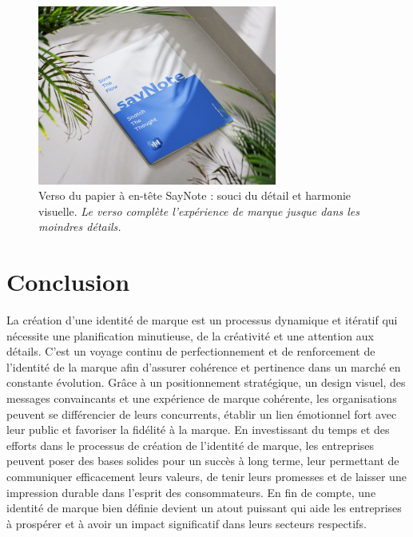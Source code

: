 \begin{figure}[H]
    \centering
    \includegraphics[width=0.7\textwidth]{docs/visual-indentity/pictures/pappier-back.jpg}
    \caption{Verso du papier à en-tête SayNote : souci du détail et harmonie visuelle. \newline\textit{Le verso complète l'expérience de marque jusque dans les moindres détails.}}
\end{figure}



\section{Conclusion}
La création d'une identité de marque est un processus dynamique et itératif qui nécessite une planification minutieuse, de la créativité et une attention aux détails. C'est un voyage continu de perfectionnement et de renforcement de l'identité de la marque afin d'assurer cohérence et pertinence dans un marché en constante évolution. Grâce à un positionnement stratégique, un design visuel, des messages convaincants et une expérience de marque cohérente, les organisations peuvent se différencier de leurs concurrents, établir un lien émotionnel fort avec leur public et favoriser la fidélité à la marque. En investissant du temps et des efforts dans le processus de création de l'identité de marque, les entreprises peuvent poser des bases solides pour un succès à long terme, leur permettant de communiquer efficacement leurs valeurs, de tenir leurs promesses et de laisser une impression durable dans l'esprit des consommateurs. En fin de compte, une identité de marque bien définie devient un atout puissant qui aide les entreprises à prospérer et à avoir un impact significatif dans leurs secteurs respectifs.

\vspace{1cm}
\begin{center}
\end{center}

